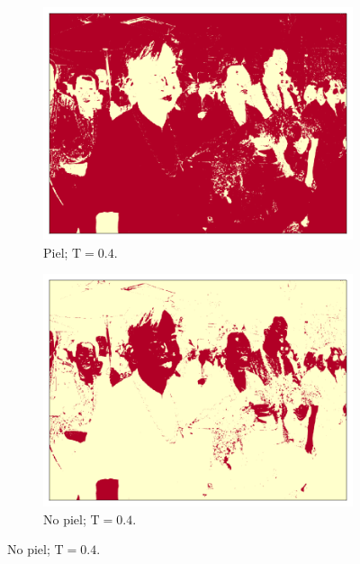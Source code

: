 \begin{figure}[ht!]
    \centering
    \begin{subfigure}{0.4\textwidth}
        \centering
        \includegraphics[width=\textwidth]{../figures/image1/image_01_treshskin_40percent.png}
        \caption{Piel; $\text{T} = 0.4$.}
        \label{fig:training_treshskin_4}
    \end{subfigure}
    \hspace{1cm}
    \begin{subfigure}{0.4\textwidth}
        \centering
        \includegraphics[width=\textwidth]{../figures/image1/image_01_treshbg_40percent.png}
        \caption{No piel; $\text{T} = 0.4$.}
        \label{fig:training_treshbg_4}

\end{subfigure}
\end{figure}
